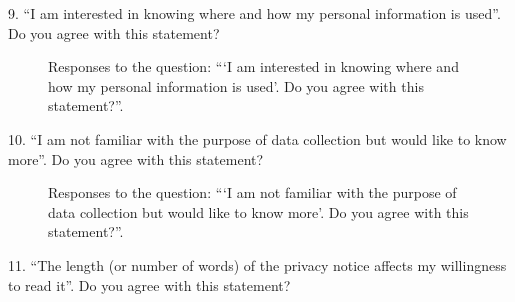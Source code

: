 9. ``I am interested in knowing where and how my personal information is used''. Do you agree with this statement?

\begin{figure}[H]
    \centering
    \caption{Responses to the question: ```I am interested in knowing where and how my personal information is used'. Do you agree with this statement?''.}
    \label{fig:survey_s2_q9}
\end{figure}

10. ``I am not familiar with the purpose of data collection but would like to know more''. Do you agree with this statement?

\begin{figure}[H]
    \begin{center}
        \caption{Responses to the question: ```I am not familiar with the purpose of data collection but would like to know more'. Do you agree with this statement?''.}
        \label{fig:survey_s2_q10}
    \end{center}
\end{figure}

11. ``The length (or number of words) of the privacy notice affects my willingness to read it''. Do you agree with this statement?

